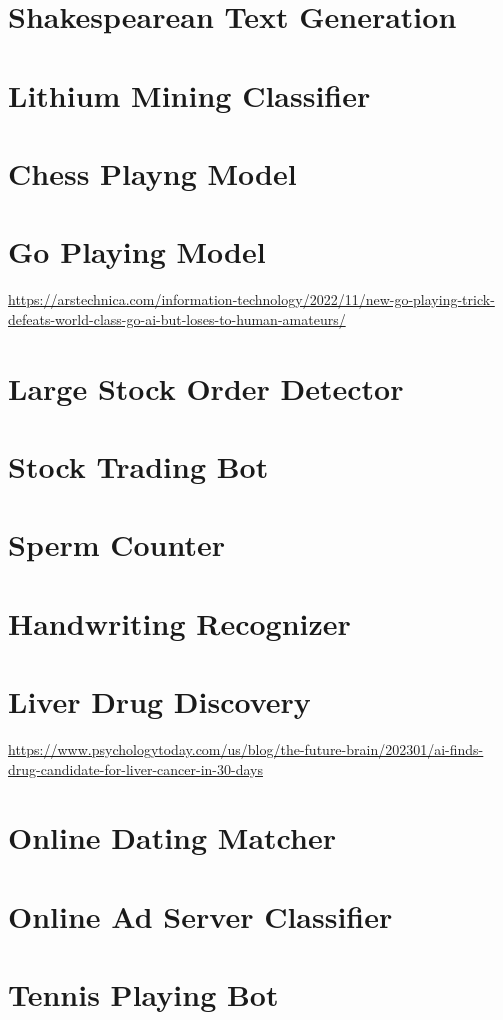 \section{Shakespearean Text Generation } 
\section{Lithium Mining Classifier}
\section{Chess Playng Model}
\section{Go Playing Model}

\url{https://arstechnica.com/information-technology/2022/11/new-go-playing-trick-defeats-world-class-go-ai-but-loses-to-human-amateurs/}

\section{Large Stock Order Detector}
\section{Stock Trading Bot}
\section{Sperm Counter}
\section{Handwriting Recognizer}
\section{Liver Drug Discovery}

\url{https://www.psychologytoday.com/us/blog/the-future-brain/202301/ai-finds-drug-candidate-for-liver-cancer-in-30-days}

\section{Online Dating Matcher}
\section{Online Ad Server Classifier}
\section{Tennis Playing Bot}

